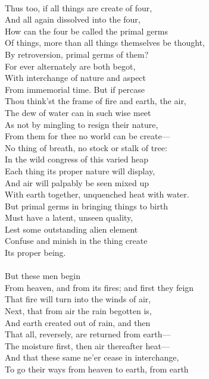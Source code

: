 \\
Thus too, if all things are create of four,\\
And all again dissolved into the four,\\
How can the four be called the primal germs\\
Of things, more than all things themselves be thought,\\
By retroversion, primal germs of them?\\
For ever alternately are both begot,\\
With interchange of nature and aspect\\
From immemorial time. But if percase\\
Thou think'st the frame of fire and earth, the air,\\
The dew of water can in such wise meet\\
As not by mingling to resign their nature,\\
From them for thee no world can be create—\\
No thing of breath, no stock or stalk of tree:\\
In the wild congress of this varied heap\\
Each thing its proper nature will display,\\
And air will palpably be seen mixed up\\
With earth together, unquenched heat with water.\\
But primal germs in bringing things to birth\\
Must have a latent, unseen quality,\\
Lest some outstanding alien element\\
Confuse and minish in the thing create\\
Its proper being.\\
\\
But these men begin\\
From heaven, and from its fires; and first they feign\\
That fire will turn into the winds of air,\\
Next, that from air the rain begotten is,\\
And earth created out of rain, and then\\
That all, reversely, are returned from earth—\\
The moisture first, then air thereafter heat—\\
And that these same ne'er cease in interchange,\\
To go their ways from heaven to earth, from earth\\
